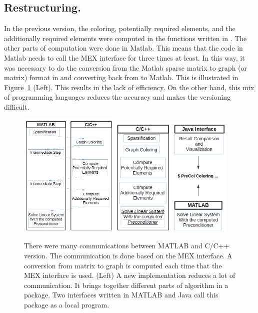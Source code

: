 \documentclass[12pt, oneside]{book}
\begin{document}
\subsection{Restructuring.}
In the previous version, the coloring, 
potentially required elements, and the additionally required elements
were computed in the functions written in .
The other parts of computation were done in Matlab.
This means that the code in Matlab needs to call the
MEX interface for three times at least. 
In this way, it was necessary to do the conversion from the Matlab sparse
matrix to graph (or matrix) format in 
and converting back from  to Matlab.
This is illustrated in Figure~\ref{f.structure} (Left).
This results in the lack of efficiency. On the other hand,
this mix of programming languages reduces 
the accuracy and makes the versioning difficult.
\begin{figure}
\centering
\includegraphics[width=0.42\textwidth]{old_struct}
\hfill
\includegraphics[width=0.52\textwidth]{new_struct}
\caption{There were many communications between MATLAB and C/C++ version. The communication
is done based on the MEX interface. A conversion from matrix to graph is computed
each time that the MEX interface is used. (Left) A new implementation reduces a lot of communication.
It brings together different parts of algorithm in a package. Two interfaces written
 in MATLAB and Java call this package as a local program.}
\label{f.structure}
\end{figure}
\end{document}
